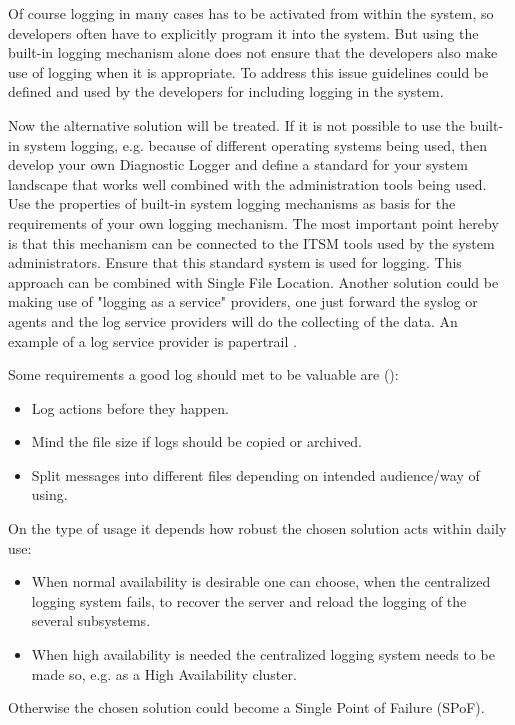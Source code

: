 Of course logging in many cases has to be activated from within the system, so developers often have to explicitly program it into the system. But using the built-in logging mechanism alone does not ensure that the developers also make use of logging when it is appropriate. To address this issue guidelines could be defined and used by the developers for including logging in the system. 


Now the alternative solution will be treated. If it is not possible to use the built-in system logging, e.g. because of different operating systems being used, then develop your own {\sc Diagnostic Logger} \cite{Harrison2011} and define a standard for your system landscape that works well combined with the administration tools being used. Use the properties of built-in system logging mechanisms as basis for the requirements of your own logging mechanism. The most important point hereby is that this mechanism can be connected to the ITSM tools used by the system administrators. Ensure that this standard system is used for logging. This approach can be combined with {\sc Single File Location}.
Another solution could be making use of "logging as a service" providers, one just forward the syslog or agents and the log service providers will do the collecting of the data. An example of a log service provider is papertrail \cite{papertrail}.

Some requirements a good log should met to be valuable are (\cite{logging-anti-patterns}):
\begin{itemize}
	\item Log actions before they happen.
	\item Mind the file size if logs should be copied or archived.
	\item Split messages into different files depending on intended audience/way of using.
\end{itemize}

On the type of usage it depends how robust the chosen solution acts within daily use:
\begin{itemize}
	\item When normal availability is desirable one can choose, when the  centralized logging system fails, to recover the server and reload the logging of the several subsystems.
	\item When high availability is needed the centralized logging system needs to be made so, e.g. as a High Availability cluster.
\end{itemize}
Otherwise the chosen solution could become a Single Point of Failure (SPoF).

